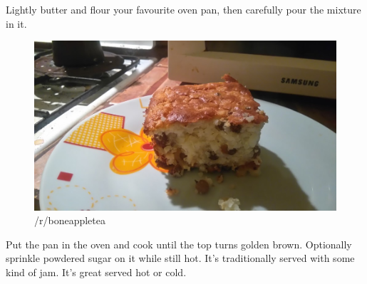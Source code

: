 \documentclass{article}
\begin{document}
Lightly butter and flour your favourite oven pan, then carefully pour the mixture in it. 

\begin{figure}[!htbp]
\centering
\includegraphics[width=\textwidth]{rizskoch_16}
\caption{/r/boneappletea}
\end{figure}


Put the pan in the oven and cook until the top turns golden brown. Optionally sprinkle powdered sugar on it while still hot. It's traditionally served with some kind of jam. It's great served hot or cold.
\end{document}
